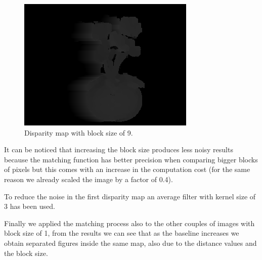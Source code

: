 \documentclass[12pt,a4paper,oneside,final,titlepage,openany,onecolumn]{article}
\begin{document}
		\begin{figure}[h!]
			\centering
			\includegraphics[width=0.8\linewidth]{images/disp_map2_01_9.png}
			\caption{Disparity map with block size of 9.}
		\end{figure}
		\par
		It can be noticed that increasing the block size produces less noisy results because the matching function has better precision when comparing bigger blocks of pixels but this comes with an increase in the computation cost (for the same reason we already scaled the image by a factor of 0.4).
		\newline
		\par
		To reduce the noise in the first disparity map an average filter with kernel size of 3 has been used.
		\newline
		\par
		Finally we applied the matching process also to the other couples of images with block size of 1, from the results we can see that as the baseline increases we obtain separated figures inside the same map, also due to the distance values and the block size.
		
\end{document}
